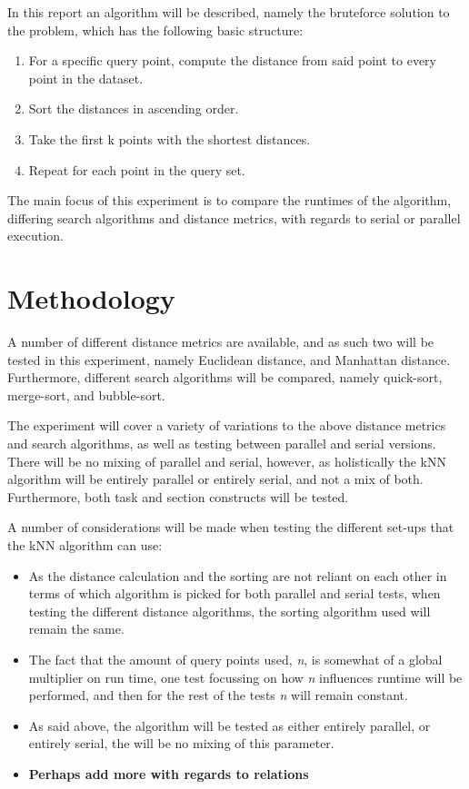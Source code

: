\documentclass[a4paper,twoside,11pt]{report}
\begin{document}
In this report an algorithm will be described, namely the bruteforce solution to the problem, which has the following basic structure:
\begin{enumerate}
	\item For a specific query point, compute the distance from said point to every point in the dataset.
	\item Sort the distances in ascending order.
	\item Take the first k points with the shortest distances.
	\item Repeat for each point in the query set.
\end{enumerate}

The main focus of this experiment is to compare the runtimes of the algorithm, differing search algorithms and distance metrics, with regards to serial or parallel execution.

\hrulefill
{}
\section*{Methodology}
A number of different distance metrics are available, and as such two will be tested in this experiment, namely Euclidean distance, and Manhattan distance. Furthermore, different search algorithms will be compared, namely quick-sort, merge-sort, and bubble-sort.

The experiment will cover a variety of variations to the above distance metrics and search algorithms, as well as testing between parallel and serial versions. There will be no mixing of parallel and serial, however, as holistically the kNN algorithm will be entirely parallel or entirely serial, and not a mix of both. Furthermore, both task and section constructs will be tested.

A number of considerations will be made when testing the different set-ups that the kNN algorithm can use:
\begin{itemize}
	\item As the distance calculation and the sorting are not reliant on each other in terms of which algorithm is picked for both parallel and serial tests, when testing the different distance algorithms, the sorting algorithm used will remain the same.
	\item The fact that the amount of query points used, \textit{n}, is somewhat of a global multiplier on run time, one test focussing on how \textit{n} influences runtime will be performed, and then for the rest of the tests \textit{n} will remain constant.
	\item As said above, the algorithm will be tested as either entirely parallel, or entirely serial, the will be no mixing of this parameter.
	\item \textbf{Perhaps add more with regards to relations}
\end{itemize}
\end{document}
